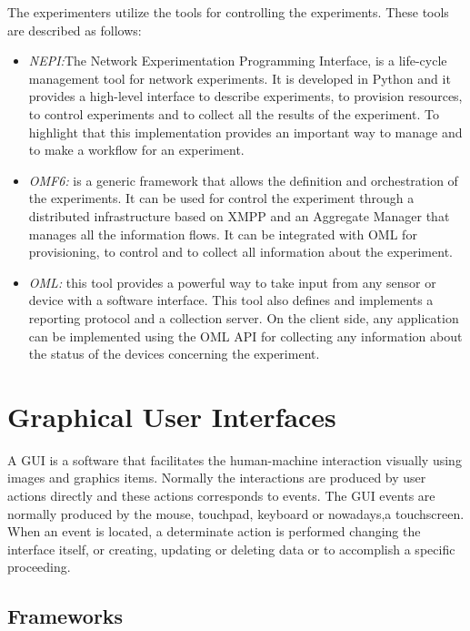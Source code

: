 The experimenters utilize the tools for controlling the experiments. These tools
are described as follows:
\begin{itemize}
\item \emph{NEPI:}The Network Experimentation Programming Interface, is a
  life-cycle management tool for network experiments. It is developed in Python
  and it provides a high-level interface to describe experiments, to provision
  resources, to control experiments and to collect all the results of the
  experiment. To highlight that this implementation provides an important way to
  manage and to make a workflow for an experiment.
\item \emph{\ac{OMF6}:} is a generic framework that allows the definition and
  orchestration of the experiments. It can be used for control the experiment
  through a distributed infrastructure based on \ac{XMPP} and an Aggregate Manager
  that manages all the information flows. It can be integrated with \ac{OML} for
  provisioning, to control and to collect all information about the experiment.
\item \emph{\ac{OML}:} this tool provides a powerful way to take input from any
  sensor or device with a software interface. This tool also defines and
  implements a reporting protocol and a collection server. On the client side,
  any application can be implemented using the \ac{OML} \ac{API} for collecting any
  information about the status of the devices concerning the experiment. 
\end{itemize}


\section{Graphical User Interfaces}

A \ac{GUI} is a software that facilitates the human-machine interaction
visually using images and graphics items. Normally the interactions are produced
by user actions directly and these actions corresponds to events. The \ac{GUI} events
are normally produced by the mouse, touchpad, keyboard or nowadays,a
touchscreen. When an event is located, a determinate action is performed
changing the interface itself, or creating, updating or deleting data or to
accomplish a specific proceeding. 


\subsection{Frameworks}

